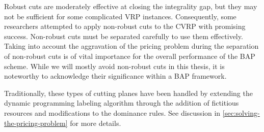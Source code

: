 \medskip

Robust cuts are moderately effective at closing the integrality gap,
but they may not be sufficient for some complicated VRP instances.
Consequently, some researchers attempted to apply non-robust cuts to the CVRP with promising success.
Non-robust cuts must be separated carefully to use them effectively.
Taking into account the aggravation of the pricing problem during the separation
of non-robust cuts is of vital importance for the overall performance of the BAP scheme.
While we will mostly avoid non-robust cuts in this thesis,
it is noteworthy to acknowledge their significance within a BAP framework.

Traditionally, these types of cutting planes have been handled by extending the
dynamic programming labeling algorithm
through the addition of fictitious resources and modifications to the dominance rules.
See discussion in \cref{sec:solving-the-pricing-problem} for more details.

\medskip

